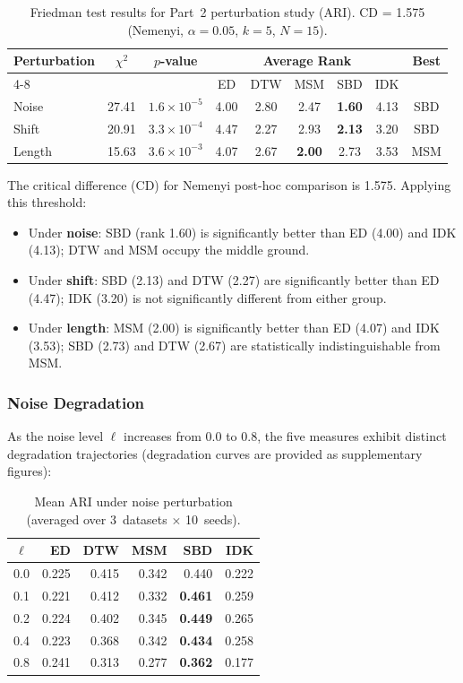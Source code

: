 \begin{table}[htbp]
\centering
\caption{Friedman test results for Part~2 perturbation study (ARI). CD = 1.575 (Nemenyi, $\alpha = 0.05$, $k=5$, $N=15$).}\label{tab:friedman-part2}
\small
\begin{tabular}{l c c c c c c c c}
\toprule
Perturbation & $\chi^2$ & $p$-value & \multicolumn{5}{c}{Average Rank} & Best \\
\cmidrule(lr){4-8}
 & & & ED & DTW & MSM & SBD & IDK & \\
\midrule
Noise  & 27.41 & $1.6 \times 10^{-5}$ & 4.00 & 2.80 & 2.47 & \textbf{1.60} & 4.13 & SBD \\
Shift  & 20.91 & $3.3 \times 10^{-4}$ & 4.47 & 2.27 & 2.93 & \textbf{2.13} & 3.20 & SBD \\
Length & 15.63 & $3.6 \times 10^{-3}$ & 4.07 & 2.67 & \textbf{2.00} & 2.73 & 3.53 & MSM \\
\bottomrule
\end{tabular}
\end{table}

The critical difference (CD) for Nemenyi post-hoc comparison is 1.575.
Applying this threshold:
\begin{itemize}
    \item Under \textbf{noise}: SBD (rank 1.60) is significantly better than ED (4.00) and IDK (4.13); DTW and MSM occupy the middle ground.
    \item Under \textbf{shift}: SBD (2.13) and DTW (2.27) are significantly better than ED (4.47); IDK (3.20) is not significantly different from either group.
    \item Under \textbf{length}: MSM (2.00) is significantly better than ED (4.07) and IDK (3.53); SBD (2.73) and DTW (2.67) are statistically indistinguishable from MSM.
\end{itemize}

\subsubsection{Noise Degradation}\label{sec:results-noise}

As the noise level $\ell$ increases from 0.0 to 0.8, the five measures exhibit distinct degradation trajectories (degradation curves are provided as supplementary figures):

\begin{table}[htbp]
\centering
\caption{Mean ARI under noise perturbation (averaged over 3~datasets $\times$ 10~seeds).}\label{tab:noise-ari}
\small
\begin{tabular}{c r r r r r}
\toprule
$\ell$ & ED & DTW & MSM & SBD & IDK \\
\midrule
0.0 & 0.225 & 0.415 & 0.342 & 0.440 & 0.222 \\
0.1 & 0.221 & 0.412 & 0.332 & \textbf{0.461} & 0.259 \\
0.2 & 0.224 & 0.402 & 0.345 & \textbf{0.449} & 0.265 \\
0.4 & 0.223 & 0.368 & 0.342 & \textbf{0.434} & 0.258 \\
0.8 & 0.241 & 0.313 & 0.277 & \textbf{0.362} & 0.177 \\
\bottomrule
\end{tabular}
\end{table}

